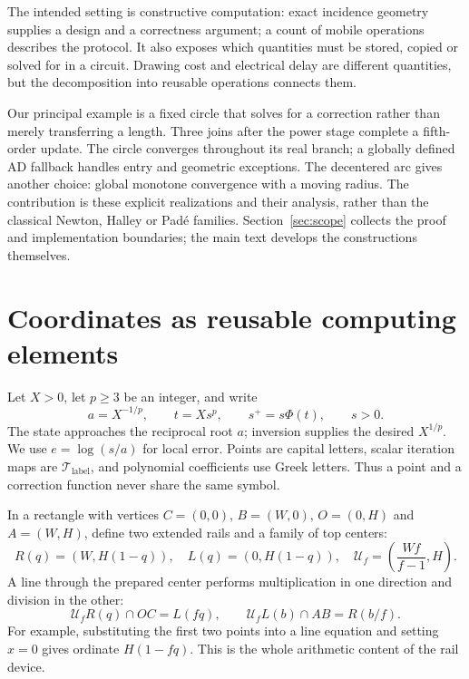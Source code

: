 \documentclass[11pt,a4paper]{article}
\newcommand{\map}[1]{\mathcal T_{\mathrm{#1}}}
\newcommand{\hub}[1]{\mathcal U_{#1}}
\begin{document}
The intended setting is constructive computation: exact incidence geometry supplies a design and a correctness argument; a count of mobile operations describes the protocol. It also exposes which quantities must be stored, copied or solved for in a circuit. Drawing cost and electrical delay are different quantities, but the decomposition into reusable operations connects them.

Our principal example is a fixed circle that solves for a correction rather than merely transferring a length. Three joins after the power stage complete a fifth-order update. The circle converges throughout its real branch; a globally defined AD fallback handles entry and geometric exceptions. The decentered arc gives another choice: global monotone convergence with a moving radius. The contribution is these explicit realizations and their analysis, rather than the classical Newton, Halley or Pad\'e families. Section~\ref{sec:scope} collects the proof and implementation boundaries; the main text develops the constructions themselves.

\clearpage
\section{Coordinates as reusable computing elements}\label{sec:rails}
Let $X>0$, let $p\ge3$ be an integer, and write
\[
 a=X^{-1/p},\qquad t=Xs^p,\qquad s^+=s\Phi(t),\qquad s>0.
\]
The state approaches the reciprocal root $a$; inversion supplies the desired $X^{1/p}$. We use $e=\log(s/a)$ for local error. Points are capital letters, scalar iteration maps are $\map{label}$, and polynomial coefficients use Greek letters. Thus a point and a correction function never share the same symbol.

In a rectangle with vertices $C=(0,0)$, $B=(W,0)$, $O=(0,H)$ and $A=(W,H)$, define two extended rails and a family of top centers:
\begin{equation}\label{eq:rails}
 R(q)=(W,H(1-q)),\quad L(q)=(0,H(1-q)),\quad
 \hub{f}=\left(\frac{Wf}{f-1},H\right).
\end{equation}
A line through the prepared center performs multiplication in one direction and division in the other:
\begin{equation}\label{eq:railops}
 \hub{f}R(q)\cap OC=L(fq),\qquad
 \hub{f}L(b)\cap AB=R(b/f).
\end{equation}
For example, substituting the first two points into a line equation and setting $x=0$ gives ordinate $H(1-fq)$. This is the whole arithmetic content of the rail device.
\end{document}
